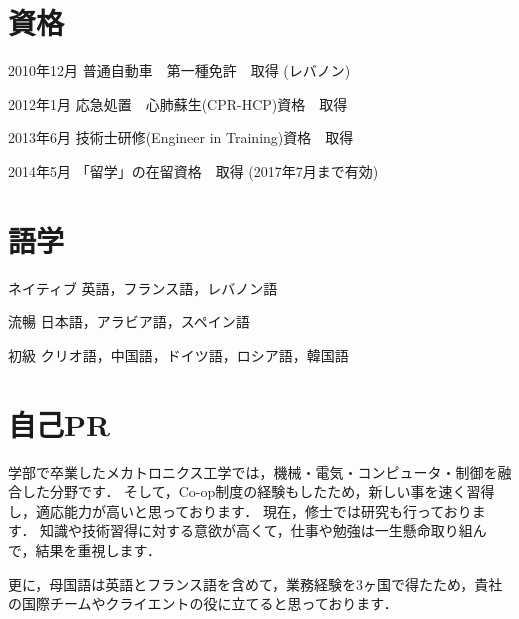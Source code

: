 \documentclass[10pt, a4paper]{article}
\begin{document}
\section{資格}
\begin{outerlist}
\item[2010年12月] 普通自動車　第一種免許　取得 (レバノン)
\item[2012年1月] 応急処置　心肺蘇生(CPR-HCP)資格　取得
\item[2013年6月] 技術士研修(Engineer in Training)資格　取得
\item[2014年5月] 「留学」の在留資格　取得 (2017年7月まで有効)
\end{outerlist}

\section{語学}
\begin{outerlist}
\item[ネイティブ] 英語，フランス語，レバノン語
\item[流暢] 日本語，アラビア語，スペイン語
\item[初級] クリオ語，中国語，ドイツ語，ロシア語，韓国語
\end{outerlist}

\section{自己PR}
\begin{outerlist}
\item[] 学部で卒業したメカトロニクス工学では，機械・電気・コンピュータ・制御を融合した分野です．
  そして，Co-op制度の経験もしたため，新しい事を速く習得し，適応能力が高いと思っております．
  現在，修士では研究も行っております．
  知識や技術習得に対する意欲が高くて，仕事や勉強は一生懸命取り組んで，結果を重視します．

\item[] 更に，母国語は英語とフランス語を含めて，業務経験を3ヶ国で得たため，貴社の国際チームやクライエントの役に立てると思っております．
\end{outerlist}
\end{document}
